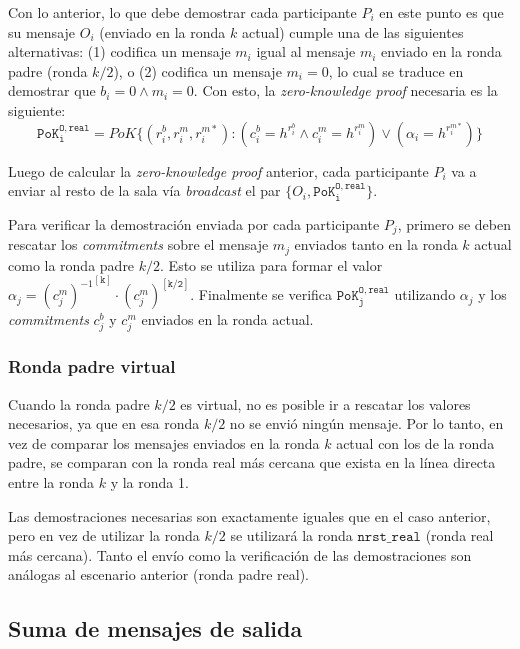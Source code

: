 Con lo anterior, lo que debe demostrar cada participante $P_i$ en este punto es que su mensaje $O_i$ (enviado en la ronda $k$ actual) cumple una de las siguientes alternativas: (1) codifica un mensaje $m_i$ igual al mensaje $m_i$ enviado en la ronda padre (ronda $k/2$), o (2) codifica un mensaje $m_i = 0$, lo cual se traduce en demostrar que $b_i = 0 \land m_i = 0$. Con esto, la \emph{zero-knowledge proof} necesaria es la siguiente: $$\mathtt{PoK_i^{O, real}} = PoK\{(r_i^b, r_i^m, r_i^{m*}) : (c_i^b = h^{r_i^b} \land c_i^m = h^{r_i^m}) \lor (\alpha_i = h^{r_i^{m*}}) \}$$

Luego de calcular la \emph{zero-knowledge proof} anterior, cada participante $P_i$ va a enviar al resto de la sala vía \emph{broadcast} el par $\{O_i, \mathtt{PoK_i^{O, real}}\}$.

Para verificar la demostración enviada por cada participante $P_j$, primero se deben rescatar los \emph{commitments} sobre el mensaje $m_j$ enviados tanto en la ronda $k$ actual como la ronda padre $k/2$. Esto se utiliza para formar el valor $\alpha_j = {(c_j^m)^{-1}}^\mathtt{[k]} \cdot {(c_j^m)}^\mathtt{[k/2]}$. Finalmente se verifica $\mathtt{PoK_j^{O, real}}$ utilizando $\alpha_j$ y los \emph{commitments} $c_j^b$ y $c_j^m$ enviados en la ronda actual.

\subsubsection{Ronda padre virtual}

Cuando la ronda padre $k/2$ es virtual, no es posible ir a rescatar los valores necesarios, ya que en esa ronda $k/2$ no se envió ningún mensaje. Por lo tanto, en vez de comparar los mensajes enviados en la ronda $k$ actual con los de la ronda padre, se comparan con la ronda real más cercana que exista en la línea directa entre la ronda $k$ y la ronda 1. 


Las demostraciones necesarias son exactamente iguales que en el caso anterior, pero en vez de utilizar la ronda $k/2$ se utilizará la ronda $\mathtt{nrst\_real}$ (ronda real más cercana). Tanto el envío como la verificación de las demostraciones son análogas al escenario anterior (ronda padre real).

\subsection{Suma de mensajes de salida}

